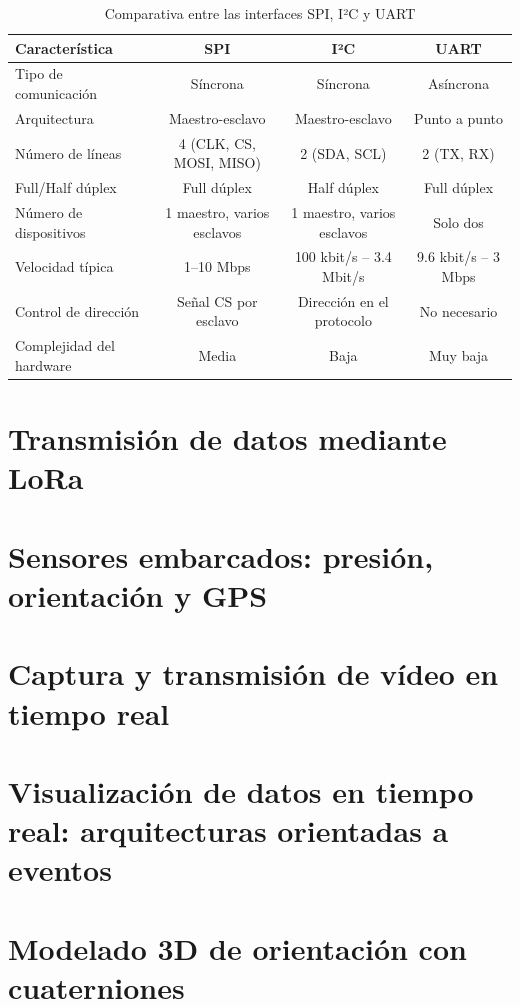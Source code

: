 \begin{table}[h]
    \centering
    \footnotesize
    \renewcommand{\arraystretch}{1.1}
    \begin{tabular}{|l|c|c|c|}
        \hline
        \textbf{Característica}  & \textbf{SPI}               & \textbf{I²C}               & \textbf{UART}       \\
        \hline
        Tipo de comunicación     & Síncrona                   & Síncrona                   & Asíncrona           \\
        \hline
        Arquitectura             & Maestro-esclavo            & Maestro-esclavo            & Punto a punto       \\
        \hline
        Número de líneas         & 4 (CLK, CS, MOSI, MISO)    & 2 (SDA, SCL)               & 2 (TX, RX)          \\
        \hline
        Full/Half dúplex         & Full dúplex                & Half dúplex                & Full dúplex         \\
        \hline
        Número de dispositivos   & 1 maestro, varios esclavos & 1 maestro, varios esclavos & Solo dos            \\
        \hline
        Velocidad típica         & 1–10 Mbps                  & 100 kbit/s – 3.4 Mbit/s    & 9.6 kbit/s – 3 Mbps \\
        \hline
        Control de dirección     & Señal CS por esclavo       & Dirección en el protocolo  & No necesario        \\
        \hline
        Complejidad del hardware & Media                      & Baja                       & Muy baja            \\
        \hline
    \end{tabular}
    \caption{Comparativa entre las interfaces SPI, I²C y UART}
    \label{tab:comparativa_interfaces}
\end{table}


\section{Transmisión de datos mediante LoRa}


\section{Sensores embarcados: presión, orientación y GPS}


\section{Captura y transmisión de vídeo en tiempo real}


\section{Visualización de datos en tiempo real: arquitecturas orientadas a eventos}


\section{Modelado 3D de orientación con cuaterniones}